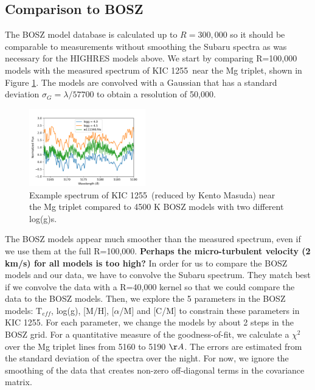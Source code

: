 \documentclass[preprint]{aastex61}
\newcommand{\shStar}{KIC 1255}
\begin{document}
\clearpage
\subsection{Comparison to BOSZ}
The BOSZ  \citep{bohlin2017bosz} model database is calculated up to $R = 300,000$ so it should be comparable to measurements without smoothing the Subaru spectra as was necessary for the HIGHRES models above.
We start by comparing R=100,000 models with the measured spectrum of \shStar\ near the Mg triplet, shown in Figure \ref{fig:mgTripletBOSZ}.
The models are convolved with a Gaussian that has a standard deviation $\sigma_G = \lambda/57700$  to obtain a resolution of 50,000.


\begin{figure}[!hbtp]
\begin{centering}
\includegraphics[width=0.45\textwidth]{images/subaru/bosz_mg_triplet.pdf}
\caption{Example spectrum of \shStar\ (reduced by Kento Masuda) near the Mg triplet compared to 4500 K BOSZ models with two different log(g)s.}\label{fig:mgTripletBOSZ}
\end{centering}
\end{figure}

The BOSZ models appear much smoother than the measured spectrum, even if we use them at the full R=100,000.
\textbf{Perhaps the micro-turbulent velocity (2 km/s) for all models is too high?}
In order for us to compare the BOSZ models and our data, we have to convolve the Subaru spectrum.
They match best if we convolve the data with a R=40,000 kernel so that we could compare the data to the BOSZ models.
Then, we explore the 5 parameters in the BOSZ models: T$_{eff}$, log(g), [M/H], [$\alpha$/M] and [C/M] to constrain these parameters in \shStar.
For each parameter, we change the models by about 2 steps in the BOSZ grid.
For a quantitative measure of the goodness-of-fit, we calculate a $\chi^2$ over the Mg triplet lines from 5160 to 5190 $\AA$.
The errors are estimated from the standard deviation of the spectra over the night.
For now, we ignore the smoothing of the data that creates non-zero off-diagonal terms in the covariance matrix.
\end{document}
